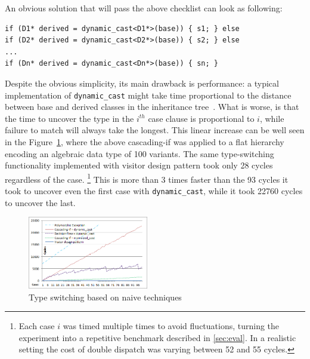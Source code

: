 \documentclass[preprint]{sigplanconf}
\makeatletter
\DeclareRobustCommand{\code}[1]{{\lstinline[breaklines=false,escapechar=@]{#1}}}
\makeatother
\begin{document}
An obvious solution that will pass the above checklist can look as following:

\begin{lstlisting}
if (D1* derived = dynamic_cast<D1*>(base)) { s1; } else
if (D2* derived = dynamic_cast<D2*>(base)) { s2; } else
...
if (Dn* derived = dynamic_cast<Dn*>(base)) { sn; }
\end{lstlisting}

Despite the obvious simplicity, its main drawback is performance: a typical 
implementation of \code{dynamic_cast} might take time proportional to the 
distance between base and derived classes in the inheritance tree~\cite{XXXXX}.
What is worse, is that the time to uncover the type in the $i^{th}$ case clause 
is proportional to $i$, while failure to match will always take the longest. 
This linear increase can be well seen in the Figure~\ref{fig:DCastVis1}, where 
the above cascading-if was applied to a flat hierarchy encoding an algebraic 
data type of 100 variants. The same type-switching functionality implemented 
with visitor design pattern took only 28 cycles regardless of the case.
\footnote{Each case $i$ was timed multiple times to avoid fluctuations, turning 
the experiment into a repetitive benchmark described in 
\textsection\ref{sec:eval}. In a realistic setting the cost of double dispatch 
was varying between 52 and 55 cycles.}
This is more than 3 times faster than the 93 cycles it took to uncover even the 
first case with \code{dynamic_cast}, while it took 22760 cycles to uncover the 
last.

\begin{figure}[htbp]
  \centering
    \includegraphics[width=0.47\textwidth]{DCast-vs-Visitors1.png}
  \caption{Type switching based on naive techniques}
  \label{fig:DCastVis1}
\end{figure}
\end{document}
